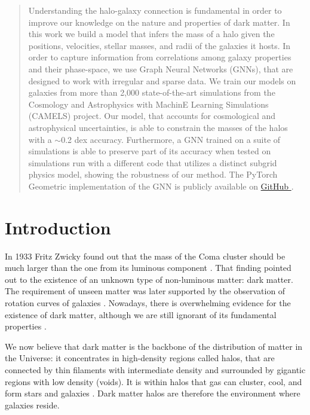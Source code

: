 \documentclass[twocolumn]{aastex631}
\begin{document}
\begin{abstract}
Understanding the halo-galaxy connection is fundamental in order to improve our knowledge on the nature and properties of dark matter. In this work we build a model that infers the mass of a halo given the positions, velocities, stellar masses, and radii of the galaxies it hosts. In order to capture information from correlations among galaxy properties and their phase-space, we use Graph Neural Networks (GNNs), that are designed to work with irregular and sparse data. We train our models on galaxies from more than 2,000 state-of-the-art simulations from the Cosmology and Astrophysics with MachinE Learning Simulations (CAMELS) project. Our model, that accounts for cosmological and astrophysical uncertainties, is able to constrain the masses of the halos with a $\sim$0.2 dex accuracy. Furthermore, a GNN trained on a suite of simulations is able to preserve part of its accuracy when tested on simulations run with a different code that utilizes a distinct subgrid physics model, showing the robustness of our method. The PyTorch Geometric implementation of the GNN is publicly available on \href{https://github.com/PabloVD/HaloGraphNet}{GitHub }.
\end{abstract}




\section{Introduction}


In 1933 Fritz Zwicky found out that the mass of the Coma cluster should be much larger than the one from its luminous component \citep{1933AcHPh...6..110Z}. That finding pointed out to the existence of an unknown type of non-luminous matter: dark matter. The requirement of unseen matter was later supported by the observation of rotation curves of galaxies \citep{1978ApJ...225L.107R, 1978PhDT.......195B}. Nowadays, there is overwhelming evidence for the existence of dark matter, although we are still ignorant of its fundamental properties \citep{2017FrPhy..12l1201Y}.

We now believe that dark matter is the backbone of the distribution of matter in the Universe: it concentrates in high-density regions called halos, that are connected by thin filaments with intermediate density and surrounded by gigantic regions with low density (voids). It is within halos that gas can cluster, cool, and form stars and galaxies \citep{2015ARA&A..53...51S}. Dark matter halos are therefore the environment where galaxies reside.
\end{document}
